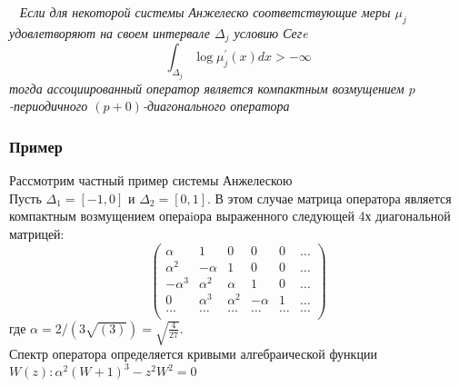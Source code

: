 \begin{teor} \rm ~\cite{KaliaguineAA1} \it
Если для некоторой системы Анжелеско соответствующие меры $\mu_j$
удовлетворяют на своем интервале $\Delta_j$ условию Сегe
$$
\int_{\Delta_j} {\log \mu_j^{'}(x) dx} > -\infty
$$
тогда ассоциированный оператор является компактным возмущением
$p$-периодичного $(p+0)$-диагонального оператора
\end{teor}

\subsubsection{Пример} Рассмотрим частный
пример системы Анжелескою \\Пусть $\Delta_1=[-1,0]$ и
$\Delta_2=[0,1]$. В этом случае матрица оператора является
компактным возмущением операiора выраженного
следующей 4х диагональной матрицей: $$%
\left(
\begin{array}{cccccccc}
\alpha & 1 & 0 & 0 & 0 & \ldots \\
\alpha^2 & -\alpha & 1 & 0 & 0 & \ldots \\
-\alpha^3 & \alpha^2 & \alpha & 1 & 0 & \ldots \\
0 & \alpha^3 & \alpha^2 & -\alpha & 1 & \ldots \\
\ldots & \ldots & \ldots & \ldots & \ldots & \ldots \\
\end{array}
\right) $$%
где $\alpha=2/(3\sqrt{(3)})=\displaystyle\sqrt{\frac{4}{27}}$. \\
Спектр оператора определяется кривыми алгебраической функции
$W(z):
\alpha^2(W+1)^3-z^2W^2=0$ \\
